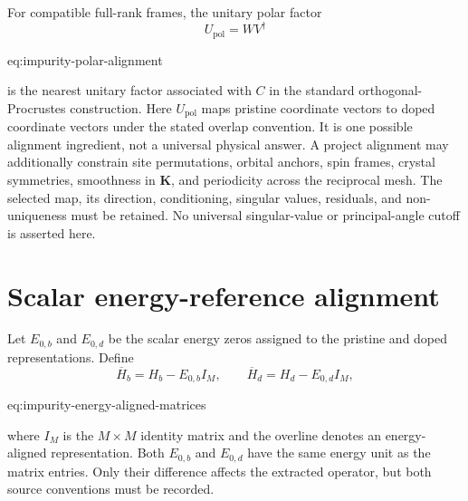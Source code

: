 For compatible full-rank frames, the unitary polar factor
\begin{equation}
    U_{\mathrm{pol}}=WV^{\dagger}
    \label{eq:impurity-polar-alignment}
\end{equation}
\begin{equationterms}{eq:impurity-polar-alignment}
\end{equationterms}
is the nearest unitary factor associated with $C$ in the standard
orthogonal-Procrustes construction. Here $U_{\mathrm{pol}}$ maps pristine
coordinate vectors to doped coordinate vectors under the stated overlap
convention. It is one possible alignment ingredient, not a universal physical
answer. A project alignment may additionally constrain site permutations,
orbital anchors, spin frames, crystal symmetries, smoothness in $\mathbf K$,
and periodicity across the reciprocal mesh. The selected map, its direction,
conditioning, singular values, residuals, and non-uniqueness must be retained.
No universal singular-value or principal-angle cutoff is asserted here.

\section{Scalar energy-reference alignment}

Let $E_{0,b}$ and $E_{0,d}$ be the scalar energy zeros assigned to the pristine
and doped representations. Define
\begin{equation}
    \overline H_b=H_b-E_{0,b}I_M,
    \qquad
    \overline H_d=H_d-E_{0,d}I_M,
    \label{eq:impurity-energy-aligned-matrices}
\end{equation}
\begin{equationterms}{eq:impurity-energy-aligned-matrices}
\end{equationterms}
where $I_M$ is the $M\times M$ identity matrix and the overline denotes an
energy-aligned representation. Both $E_{0,b}$ and $E_{0,d}$ have the same
energy unit as the matrix entries. Only their difference affects the extracted
operator, but both source conventions must be recorded.

